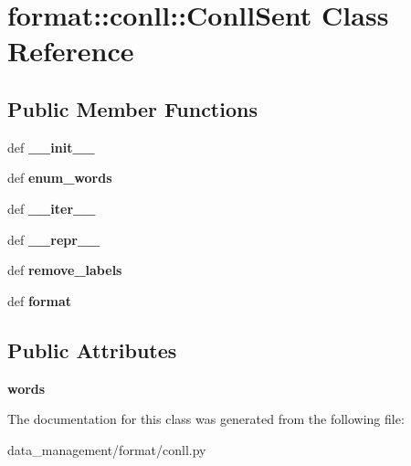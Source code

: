 \hypertarget{classformat_1_1conll_1_1ConllSent}{
\section{format::conll::ConllSent Class Reference}
\label{classformat_1_1conll_1_1ConllSent}
}
\subsection*{Public Member Functions}
\begin{DoxyCompactItemize}
\item 
\hypertarget{classformat_1_1conll_1_1ConllSent_ab449fb1d700d587dca632585be5f9142}{
def {\bfseries \_\-\_\-init\_\-\_\-}}
\label{classformat_1_1conll_1_1ConllSent_ab449fb1d700d587dca632585be5f9142}

\item 
\hypertarget{classformat_1_1conll_1_1ConllSent_a219e337408f3ea883becd34f260a28c7}{
def {\bfseries enum\_\-words}}
\label{classformat_1_1conll_1_1ConllSent_a219e337408f3ea883becd34f260a28c7}

\item 
\hypertarget{classformat_1_1conll_1_1ConllSent_aea5832f2c0924bead6ddc77c73e3351c}{
def {\bfseries \_\-\_\-iter\_\-\_\-}}
\label{classformat_1_1conll_1_1ConllSent_aea5832f2c0924bead6ddc77c73e3351c}

\item 
\hypertarget{classformat_1_1conll_1_1ConllSent_a8b853efaa60d79267082081c26d3c1a5}{
def {\bfseries \_\-\_\-repr\_\-\_\-}}
\label{classformat_1_1conll_1_1ConllSent_a8b853efaa60d79267082081c26d3c1a5}

\item 
\hypertarget{classformat_1_1conll_1_1ConllSent_ad587ddeb08f8456739731fa7c763a02b}{
def {\bfseries remove\_\-labels}}
\label{classformat_1_1conll_1_1ConllSent_ad587ddeb08f8456739731fa7c763a02b}

\item 
\hypertarget{classformat_1_1conll_1_1ConllSent_a84db8c6b68a0fe944db3582729395610}{
def {\bfseries format}}
\label{classformat_1_1conll_1_1ConllSent_a84db8c6b68a0fe944db3582729395610}

\end{DoxyCompactItemize}
\subsection*{Public Attributes}
\begin{DoxyCompactItemize}
\item 
\hypertarget{classformat_1_1conll_1_1ConllSent_a2946a3f86a90419ea9cff7cb581aa8db}{
{\bfseries words}}
\label{classformat_1_1conll_1_1ConllSent_a2946a3f86a90419ea9cff7cb581aa8db}

\end{DoxyCompactItemize}


The documentation for this class was generated from the following file:\begin{DoxyCompactItemize}
\item 
data\_\-management/format/conll.py\end{DoxyCompactItemize}
